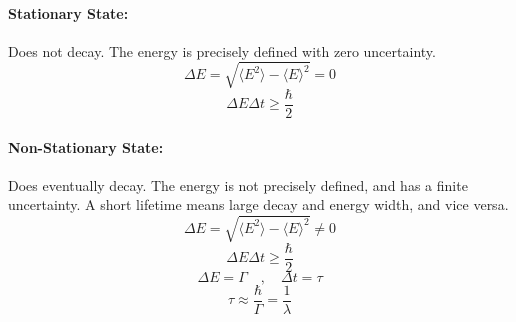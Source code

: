 \paragraph{Stationary State:}
Does not decay. The energy is precisely defined with zero uncertainty. 
\begin{equation}
  ΔE = \sqrt{\langle E^2 \rangle - \langle E \rangle^2} = 0
\end{equation}
\begin{equation}
  ΔE Δt ≥ \frac{\hbar}{2}
\end{equation}

\paragraph{Non-Stationary State:}
Does eventually decay. The energy is not precisely defined, and has a finite uncertainty. A short lifetime means large decay and energy width, and vice versa. 
\begin{equation}
  ΔE = \sqrt{\langle E^2 \rangle - \langle E \rangle^2} ≠ 0
\end{equation}
\begin{equation}
  ΔE Δt ≥ \frac{\hbar}{2}
\end{equation}
\begin{equation}
  ΔE = Γ \quad , \quad  Δt = τ
\end{equation}
\begin{equation}
  τ ≈ \frac{\hbar}{Γ} = \frac{1}{λ}
\end{equation}